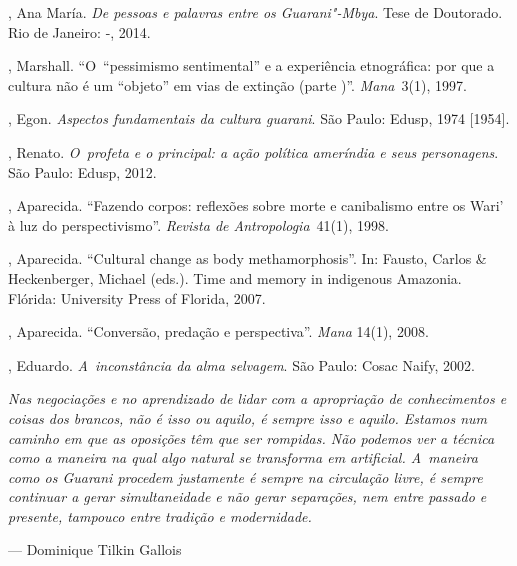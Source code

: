 \begin{Parskip}
  , Ana María. \emph{De pessoas e palavras entre os Guarani"-Mbya}.
Tese de Doutorado. Rio de Janeiro: -, 2014.

, Marshall. ``O~``pessimismo sentimental'' e a experiência
etnográfica: por que a cultura não é um ``objeto'' em vias de extinção
(parte )''. \emph{Mana~}3(1), 1997.

, Egon. \emph{Aspectos fundamentais da cultura guarani}. São Paulo:
Edusp, 1974 [1954].

, Renato. \emph{O~profeta e o principal: a ação política ameríndia e
seus personagens}. São Paulo: Edusp, 2012.

, Aparecida. ``Fazendo corpos: reflexões sobre morte e canibalismo
entre os Wari’ à luz do perspectivismo''. \emph{Revista de Antropologia}~41(1),
1998.

, Aparecida. ``Cultural change as body methamorphosis''. In: Fausto,
Carlos \& Heckenberger, Michael (eds.). Time and memory in indigenous
Amazonia. Flórida: University Press of Florida, 2007.

, Aparecida. ``Conversão, predação e perspectiva''. \emph{Mana} 14(1), 2008.

  , Eduardo. \emph{A~inconstância da alma selvagem}. São Paulo:
Cosac Naify, 2002.
\end{Parskip}

\clearpage

\vspace*{\fill}

\begin{flushright}
\begin{minipage}[c]{0.85\textwidth}
\raggedleft
\footnotesize
\emph{Nas negociações e no aprendizado de lidar com a apropriação de
conhecimentos e coisas dos brancos, não é isso \emph{ou} aquilo, é sempre isso
\emph{e} aquilo. Estamos num caminho em que as oposições têm que ser rompidas.
Não podemos ver a técnica como a maneira na qual algo natural se
transforma em artificial. A~maneira como os Guarani procedem justamente
é sempre na circulação livre, é sempre continuar a gerar simultaneidade
e não gerar separações, nem entre passado e presente, tampouco entre
tradição e modernidade.}

\smallskip
\hspace*{\fill}--- Dominique Tilkin Gallois
\end{minipage}
\end{flushright}

